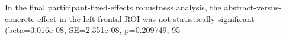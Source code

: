 In the final participant-fixed-effects robustness analysis, the abstract-versus-concrete effect in the left frontal ROI was not statistically significant (beta=3.016e-08, SE=2.351e-08, p=0.209749, 95%
